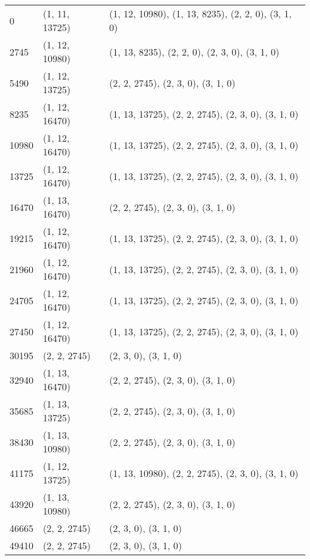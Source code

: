 \begin{center}
{\begin{tabularx}{\textwidth}{p{}|p{}|p{}}
			0                      & (1, 11, 13725) & (1, 12, 10980), (1, 13, 8235), (2, 2, 0), (3, 1, 0) \\
			2745                   & (1, 12, 10980) & (1, 13, 8235), (2, 2, 0), (2, 3, 0), (3, 1, 0)      \\
			5490                   & (1, 12, 13725) & (2, 2, 2745), (2, 3, 0), (3, 1, 0)                  \\
			8235                   & (1, 12, 16470) & (1, 13, 13725), (2, 2, 2745), (2, 3, 0), (3, 1, 0)  \\
			10980                  & (1, 12, 16470) & (1, 13, 13725), (2, 2, 2745), (2, 3, 0), (3, 1, 0)  \\
			13725                  & (1, 12, 16470) & (1, 13, 13725), (2, 2, 2745), (2, 3, 0), (3, 1, 0)  \\
			16470                  & (1, 13, 16470) & (2, 2, 2745), (2, 3, 0), (3, 1, 0)                  \\
			19215                  & (1, 12, 16470) & (1, 13, 13725), (2, 2, 2745), (2, 3, 0), (3, 1, 0)  \\
			21960                  & (1, 12, 16470) & (1, 13, 13725), (2, 2, 2745), (2, 3, 0), (3, 1, 0)  \\
			24705                  & (1, 12, 16470) & (1, 13, 13725), (2, 2, 2745), (2, 3, 0), (3, 1, 0)  \\
			27450                  & (1, 12, 16470) & (1, 13, 13725), (2, 2, 2745), (2, 3, 0), (3, 1, 0)  \\
			30195                  & (2, 2, 2745)   & (2, 3, 0), (3, 1, 0)                                \\
			32940                  & (1, 13, 16470) & (2, 2, 2745), (2, 3, 0), (3, 1, 0)                  \\
			35685                  & (1, 13, 13725) & (2, 2, 2745), (2, 3, 0), (3, 1, 0)                  \\
			38430                  & (1, 13, 10980) & (2, 2, 2745), (2, 3, 0), (3, 1, 0)                  \\
			41175                  & (1, 12, 13725) & (1, 13, 10980), (2, 2, 2745), (2, 3, 0), (3, 1, 0)  \\
			43920                  & (1, 13, 10980) & (2, 2, 2745), (2, 3, 0), (3, 1, 0)                  \\
			46665                  & (2, 2, 2745)   & (2, 3, 0), (3, 1, 0)                                \\
			49410                  & (2, 2, 2745)   & (2, 3, 0), (3, 1, 0)                                \\

\end{tabularx}}
\end{center}

